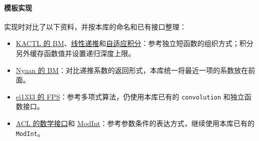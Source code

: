 \hypertarget{ux6a21ux677fux5b9eux73b0}{%
\paragraph{模板实现}\label{ux6a21ux677fux5b9eux73b0}}

实现时对比了以下资料，并按本库的命名和已有接口整理：

\begin{itemize}
\tightlist
\item
  \href{https://github.com/kth-competitive-programming/kactl/blob/main/content/numerical/BerlekampMassey.h}{KACTL 的 BM}、\href{https://github.com/kth-competitive-programming/kactl/blob/main/content/numerical/LinearRecurrence.h}{线性递推}和\href{https://github.com/kth-competitive-programming/kactl/blob/main/content/numerical/IntegrateAdaptive.h}{自适应积分}：参考独立短函数的组织方式；积分另外缓存函数值并设置递归深度上限。
\item
  \href{https://github.com/NyaanNyaan/library/blob/master/fps/berlekamp-massey.hpp}{Nyaan 的 BM}：对比递推系数的返回形式，本库统一将最近一项的系数放在前面。
\item
  \href{https://github.com/ei1333/library/blob/master/math/fps/formal-power-series-friendly-ntt.hpp}{ei1333 的 FPS}：参考多项式算法，仍使用本库已有的 \passthrough{\lstinline!convolution!} 和独立函数接口。
\item
  \href{https://github.com/atcoder/ac-library/blob/master/atcoder/math.hpp}{ACL 的数学接口}和 \href{https://github.com/atcoder/ac-library/blob/master/atcoder/modint.hpp}{ModInt}：参考参数条件的表达方式，继续使用本库已有的 \passthrough{\lstinline!ModInt!}。
\end{itemize}
